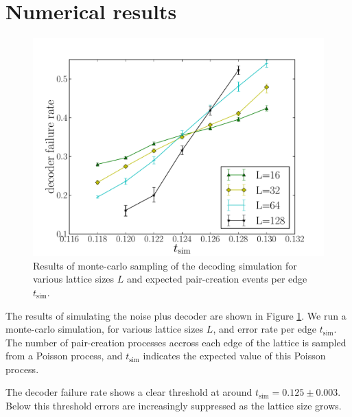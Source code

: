 \section{Numerical results}


\begin{figure}
\begin{center}
\includegraphics[width=0.8\columnwidth]{anyons-kyle.pdf}
\caption{
Results of monte-carlo sampling of the decoding simulation for
various lattice sizes $L$ and expected pair-creation events per
edge $t_{\mathrm{sim}}.$
}
\label{AnyonsKyle}
\end{center}
\end{figure}

The results of simulating the noise plus decoder are shown in
Figure \ref{AnyonsKyle}.
We run a monte-carlo simulation, for various lattice sizes $L$,
and error rate per edge $t_{\mathrm{sim}}.$
The number of pair-creation
processes accross each edge of the lattice
is sampled from a Poisson process,
and $t_{\mathrm{sim}}$ indicates the expected value of this 
Poisson process.

The decoder failure rate shows a clear threshold at around 
$t_{\mathrm{sim}}=0.125\pm0.003.$ 
Below this threshold errors are increasingly suppressed 
as the lattice size grows.


